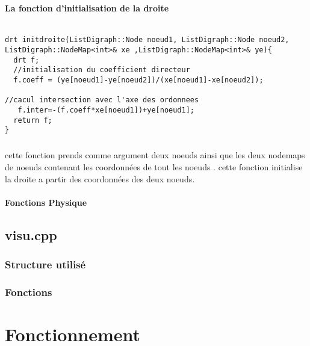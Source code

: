 \documentclass[a4paper,10pt]{report}
\begin{document}
	\subsubsection{La fonction d'initialisation de la droite}
	  
	  \begin{scriptsize}
	    \begin{verbatim}
	     
drt initdroite(ListDigraph::Node noeud1, ListDigraph::Node noeud2, ListDigraph::NodeMap<int>& xe ,ListDigraph::NodeMap<int>& ye){
  drt f;
  //initialisation du coefficient directeur
  f.coeff = (ye[noeud1]-ye[noeud2])/(xe[noeud1]-xe[noeud2]);
  
//cacul intersection avec l'axe des ordonnees
   f.inter=-(f.coeff*xe[noeud1])+ye[noeud1];
  return f;
}
	    \end{verbatim}
	\end{scriptsize}
	\paragraph{}
	  cette fonction prends comme argument deux noeuds ainsi que les deux nodemaps de noeuds contenant les coordonnées de tout les noeuds .
	  cette fonction initialise la droite a partir des coordonnées des deux noeuds.
	  
	\subsubsection{Fonctions Physique}
	  \paragraph{}
	  
	  
	  
  \section{visu.cpp}
    \subsection{Structure utilisé}
    \subsection{Fonctions}
   
\chapter{Fonctionnement}
\end{document}
